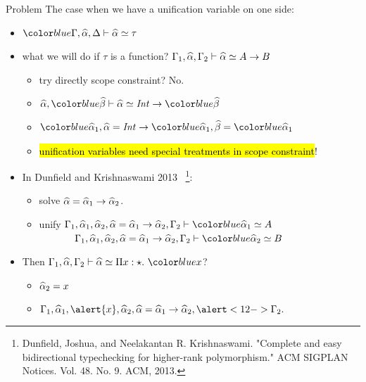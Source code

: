 \documentclass{beamer}
\begin{document}
\begin{frame}{Problem}
  The case when we have a unification variable on one side:
  \begin{itemize}
    \item $\hl{\tctx}, \genA, \ctxr \byinf \genA \uni \tau$
    \item<2-> what we will do if $\tau$ is a function?
       $\Gamma_1, \widehat{\alpha}, \Gamma_2 \vdash \widehat{\alpha} \simeq A \to B$
      \begin{itemize}
        \item<3-> try directly scope constraint? \alert{No.}
        \item<4-> $\genA, \hl{\genB} \byuni \genA \uni \Int \to \hl{\genB}$
        \item<5-> $\hl{\genA_1}, \genA = \Int \to \hl{\genA_1}, \genB = \hl{\genA_1}$
        \item<6-> \hl{unification variables need special treatments in scope constraint}!
      \end{itemize}
    \item<7-> In Dunfield and Krishnaswami 2013
      ~\footnote{Dunfield, Joshua, and Neelakantan R. Krishnaswami. "Complete and
        easy bidirectional typechecking for higher-rank polymorphism." ACM SIGPLAN
        Notices. Vol. 48. No. 9. ACM, 2013.}:
      \begin{itemize}
        \item<8-> solve $\widehat{\alpha} = \widehat{\alpha}_1 \to \widehat{\alpha}_2$.
        \item<8-> unify
          $\tctx_1, \genA_1, \genA_2, \genA = \genA_1 \to \genA_2, \tctx_2 \byuni \hl{\genA_1 \uni A}$\\
          ~~~~~~~$\tctx_1, \genA_1, \genA_2, \genA = \genA_1 \to \genA_2, \tctx_2 \byuni \hl{\genA_2 \uni B}$
      \end{itemize}
    \item<9-> Then $\tctx_1, \genA, \tctx_2 \byuni \genA \uni \bpi x \star \hl{x}$?
      \begin{itemize}
        \item<10-> $\widehat{\alpha}_2 = x$
        \item<11-> $\tctx_1, \genA_1, \alert{x}, \genA_2, \genA = \genA_1 \to
          \genA_2, \alert<12->{\tctx_2}.$ 
      \end{itemize}
  \end{itemize}
\end{frame}
\end{document}
